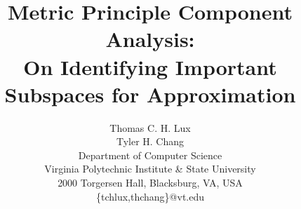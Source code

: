 \documentclass{scspaperproc}
\theoremstyle{scsthe}
\begin{document}
%



\def\SCSconferenceacro{SpringSim'20}

\def\SCSpublicationyear{2020}

\def\SCSconferencedates{May 19-May 21}

\def\SCSconferencevenue{Fairfax, VA, USA}

\title{Metric Principle Component Analysis: \\ On Identifying Important Subspaces for Approximation}

\author{
Thomas C. H. Lux\\
Tyler H. Chang\\ [12pt]
Department of Computer Science\\
Virginia Polytechnic Institute \& State University\\
2000 Torgersen Hall, Blacksburg, VA, USA\\
\{tchlux,thchang\}@vt.edu\\
}


\maketitle
\end{document}
